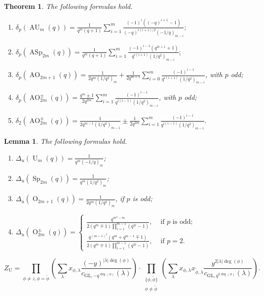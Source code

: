 \documentclass[10pt,a4paper]{amsart}
\newtheorem{thm}{Theorem}
\newtheorem{lemma}{Lemma}
\DeclareMathOperator{\AO}{AO}
\DeclareMathOperator{\ASp}{ASp}
\DeclareMathOperator{\AU}{AU}
\newcommand{\GL}{\mathrm{GL}}
\DeclareMathOperator{\Or}{O}
\DeclareMathOperator{\Sp}{Sp}
\DeclareMathOperator{\U}{U}
\begin{document}
\begin{thm}
\label{p_main}
The following formulas hold.
\begin{enumerate}
\item \label{p_Unitary}
$\displaystyle \delta_p(\AU_m(q))=
\frac{1}{q^m(q+1)}\sum_{i=1}^m\frac{(-1)^i((-q)^{i+1}-1)}{(-q)^{i(i+1)/2}(-1/q)_{m-i}};$
\item \label{p_Symplectic}
$\displaystyle \delta_p(\ASp_{2m}(q))=\frac{1}{q^m(q+1)}\sum_{i=1}^{m}\frac{(-1)^{i-1}(q^{2i+1}+1)}{q^{i(i+1)}(1/q^2)_{m-i}};$
\item \label{p_Orthogonal_2m+1}
$\displaystyle \delta_p(\AO_{2m+1}(q))=\frac{1}{2q^m(1/q^2)_{m}}+\frac{1}{2q^{m+1}}\sum_{i=0}^{m}\frac{(-1)^{i-1}}{q^{i(i+1)}(1/q^2)_{m-i}}$, with $p$ odd;
\item \label{p_Orthogonal_2modd}
$\displaystyle \delta_p(\AO^{\pm}_{2m}(q))=\frac{q^m\pm1}{2q^{2m}}\sum_{i=1}^{m}\frac{(-1)^{i-1}}{q^{i(i-1)}(1/q^2)_{m-i}}$, with $p$ odd;
\item \label{p_Orthogonal_2meven}
$\displaystyle \delta_2(\AO^{\pm}_{2m}(q))=\frac{1}{2q^{m-1}(1/q^2)_{m-1}}\pm \frac{1}{2q^{2m}}\sum_{i=1}^{m}\frac{(-1)^{i-1}}{q^{i(i-1)}(1/q^2)_{m-i}}.$
\end{enumerate}
\end{thm}

\begin{lemma}
\label{steinberg}
The following formulas hold.
\begin{enumerate}
    \item \label{p_u}
    $\displaystyle \Delta_u(\U_m(q))=\frac{1}{q^m(-1/q)_m}$;
    \item \label{p_sp} $\displaystyle \Delta_u(\Sp_{2m}(q))=\frac{1}{q^m(1/q^2)_m}$;
    \item \label{p_o_2m1} $\displaystyle \Delta_u(\Or_{2m+1}(q))=\frac{1}{2q^m(1/q^2)_m}$, if $p$ is odd;
    \item \label{p_o2m} $\displaystyle \Delta_u(\Or^{\pm}_{2m}(q))=
    \begin{cases}
    \displaystyle\frac{q^{m^2-m}}{2(q^m \mp 1)\prod_{i=1}^{m-1}(q^{2i}-1)}, & \text{ if } p \text{ is odd};\\
    \displaystyle\frac{q^{(m-1)^2}(q^m+q^{m-1}\mp1)}{2(q^m \mp 1)\prod_{i=1}^{m-1}(q^{2i}-1)}, & \text{ if } p=2.
    \end{cases}$
\end{enumerate}
\end{lemma}

\begin{equation}
\label{fact_Z_u}
Z_{\U}= \prod_{\phi \neq z, \phi=\widetilde{\phi}} \left( \sum_{\lambda}x_{\phi,\lambda}\frac{(-y)^{|\lambda|\deg(\phi)}}{c_{\GL,-q^{\deg(\phi)}}(\lambda)}\right)\cdot \prod_{\substack{\{\phi, \widetilde{\phi}\} \\ \phi \neq \widetilde{\phi}}} \left( \sum_{\lambda}x_{\phi,\lambda}x_{\widetilde{\phi},\lambda}\frac{y^{2|\lambda|\deg(\phi)}}{c_{\GL,q^{2\deg(\phi)}}(\lambda)}\right). 
\end{equation}
\end{document}
